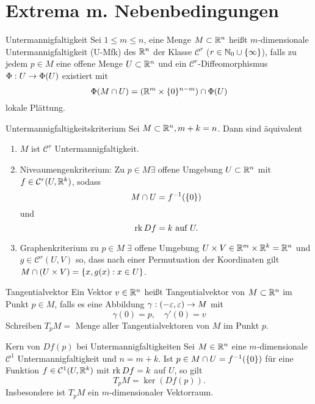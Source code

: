 \documentclass[main.tex]{subfiles}
\begin{document}
\section*{Extrema m. Nebenbedingungen}

\begin{karte}{Untermannigfaltigkeit}
    Sei \( 1 \leq m \leq n \), eine Menge \( M \subset \mathbb{R}^n \) 
    heißt \(m\)-dimensionale Untermannigfaltigkeit 
    (U-Mfk) des \( \mathbb{R}^n \) der Klasse \( \mathcal{C}^r \) 
    (\(r \in \mathbb{N}_0 \cup \{\infty\} \)), falls zu jedem 
    \( p \in M \) eine offene Menge \( U \subset \mathbb{R}^n \) 
    und ein \( \mathcal{C}^r \)-Diffeomorphismus
    \(\Phi : U \rightarrow \Phi(U)\) existiert mit 
    \[ \Phi(M \cap U) = (\mathbb{R}^m \times \{0\}^{n-m}) \cap \Phi(U)\]
    lokale Plättung.
\end{karte}

\begin{karte}{Untermannigfaltigkeitskriterium}
    Sei \( M \subset \mathbb{R}^n, m + k = n \). Dann sind äquivalent
    \begin{enumerate}
        \item \(M\) ist \(\mathcal{C}^r \) Untermannigfaltigkeit.        
        \item Niveaumengenkriterium: Zu \( p \in M \exists \) offene 
        Umgebung \( U \subset \mathbb{R}^n \) mit 
        \( f \in \mathcal{C}^r(U, \mathbb{R}^k) \), sodass
        \[ M \cap U = f^{-1}(\{0\}) \]
        und
        \[ \operatorname{rk} Df = k \text{ auf } U. \]
        \item Graphenkriterium zu \(p \in M \; \exists \) offene
        Umgebung \(U \times V \in \mathbb{R}^m \times \mathbb{R}^k = \mathbb{R}^n\) und
        \(g \in \mathcal{C}^r (U, V)\) so, dass
        nach einer Permutuation der Koordinaten gilt \(M \cap (U \times V) 
        = \{x,g(x) : x \in U\}\).
    \end{enumerate}
\end{karte}

\begin{karte}{Tangentialvektor}
    Ein Vektor \(v \in \mathbb{R}^n\) heißt Tangentialvektor von \(M \subset \mathbb{R}^n\)
    im Punkt \(p \in M\), falls
    es eine Abbildung \( \gamma : (-\varepsilon, \varepsilon) \rightarrow M \) mit 
    \[ \gamma(0) = p, \quad \gamma'(0) = v \]
    Schreiben 
    \( T_p M = \) Menge aller Tangentialvektoren von \(M\) im Punkt \(p\).
\end{karte}

\begin{karte}{Kern von \( Df(p) \) bei Untermannigfaltigkeiten}
    Sei \( M \in \mathbb{R}^n \) eine \(m\)-dimensionale 
    \( \mathcal{C}^1 \) Untermannigfaltigkeit  und \(n = m + k\).
    Ist \( p \in M \cap U = f^{-1}(\{0\}) \) für eine
    Funktion \( f \in \mathcal{C}^1(U, \mathbb{R}^k) \) mit 
    \( \operatorname{rk} Df = k \) auf \(U\),
    so gilt 
    \[ T_p M = \ker(Df(p)). \]
    Insbesondere ist \( T_p M \) ein \(m\)-dimensionaler 
    Vektorraum.
\end{karte}
\end{document}
